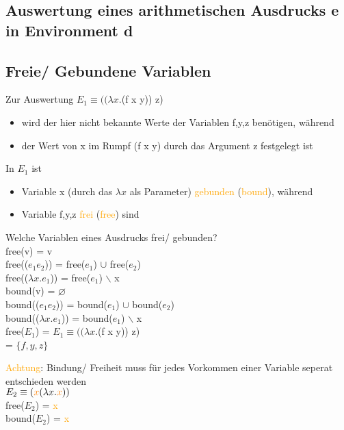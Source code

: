 \documentclass[paper=a4, fontsize=11pt]{scrartcl}
\numberwithin{equation}{section}
\numberwithin{figure}{section}
\numberwithin{table}{section}
\begin{document}
\begin{lstlistig}
\subsection{Auswertung eines arithmetischen Ausdrucks e in Environment d}

\subsection{Freie/ Gebundene Variablen}
Zur Auswertung $E_{1} \equiv ((\lambda x.$(f x y)) z)
\begin{itemize}
\item wird der hier nicht bekannte Werte der Variablen f,y,z benötigen, während
\item der Wert von x im Rumpf (f x y) durch das Argument z festgelegt ist
\end{itemize} 

In $E_{1}$ ist
\begin{itemize}
\item Variable x (durch das $\lambda x$ als Parameter) \textcolor{orange}{gebunden} (\textcolor{orange}{bound}), während
\item Variable f,y,z \textcolor{orange}{frei} (\textcolor{orange}{free}) sind
\end{itemize}

Welche Variablen eines Ausdrucks frei/ gebunden? \\
free(v) = {v} \\
free(($e_{1} e_{2}$)) = free($e_{1}$) $\cup$ free($e_{2}$) \\
free(($\lambda x.e_{1}$)) = free($e_{1}$) $\backslash$ {x} \\

bound(v) = $\varnothing$ \\
bound(($e_{1} e_{2}$)) = bound($e_{1}$) $\cup$ bound($e_{2}$) \\
bound(($\lambda x.e_{1}$)) = bound($e_{1}$) $\backslash$ {x} \\

free($E_{1}$) = $E_{1} \equiv ((\lambda x.$(f x y)) z) \\
= $\{ f,y,z \}$

\textcolor{orange}{Achtung}: Bindung/ Freiheit muss für jedes Vorkommen einer Variable seperat entschieden werden \\

$E_{2} \equiv (\textcolor{orange}{x} (\lambda x.\textcolor{orange}{x}))$ \\
free($E_{2}$) = {\textcolor{orange}{x}} \\
bound($E_{2}$) = {\textcolor{orange}{x}}


\end{lstlistig}
\end{document}
